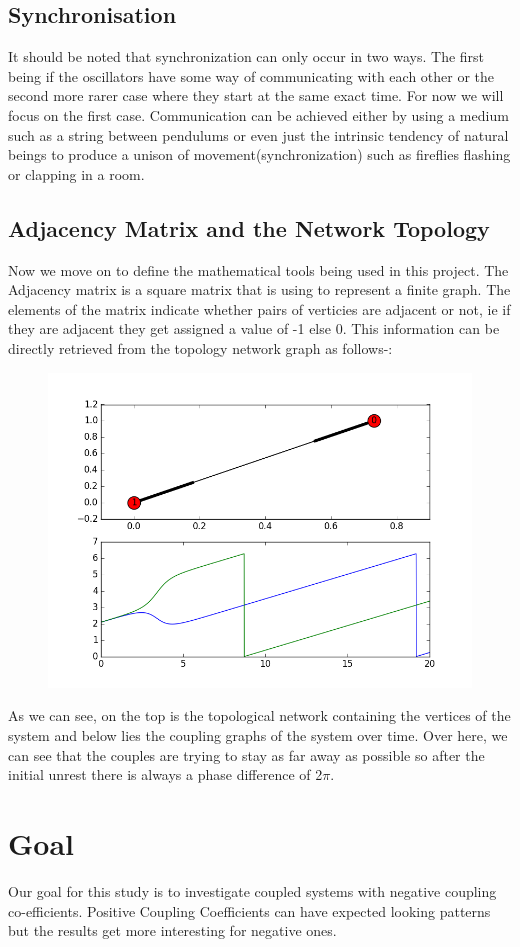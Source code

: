 \documentclass[12pt]{article}
\begin{document}
\subsection{Synchronisation}
It should be noted that synchronization can only occur in two ways. The first being if the oscillators have some way of communicating with each other or the second more rarer case where they start at the same exact time. For now we will focus on the first case. Communication can be achieved either by using a medium such as a string between pendulums or even just the intrinsic tendency of natural beings to produce a unison of movement(synchronization) such as fireflies flashing or clapping in a room.

\subsection{Adjacency Matrix and the Network Topology }
Now we move on to define the mathematical tools being used in this project. The Adjacency matrix is a square matrix that is using to represent a finite graph. The elements of the matrix indicate whether pairs of verticies are adjacent or not, ie if they are adjacent they get assigned a value of -1 else 0. This information can be directly retrieved from the topology network graph as follows-:

\begin{figure}[h!]
	\centering
	\includegraphics[width=0.5\linewidth]{examplefigure}
	\caption{}
\end{figure}

As we can see, on the top is the topological network containing the vertices of the system and below lies the coupling graphs of the system over time. Over here, we can see that the couples are trying to stay as far away as possible so after the initial unrest there is always a phase difference of 2$\pi$.


\section{Goal}
Our goal for this study is to investigate coupled systems with negative coupling co-efficients. Positive Coupling Coefficients can have expected looking patterns but the results get more interesting for negative ones.
\end{document}
